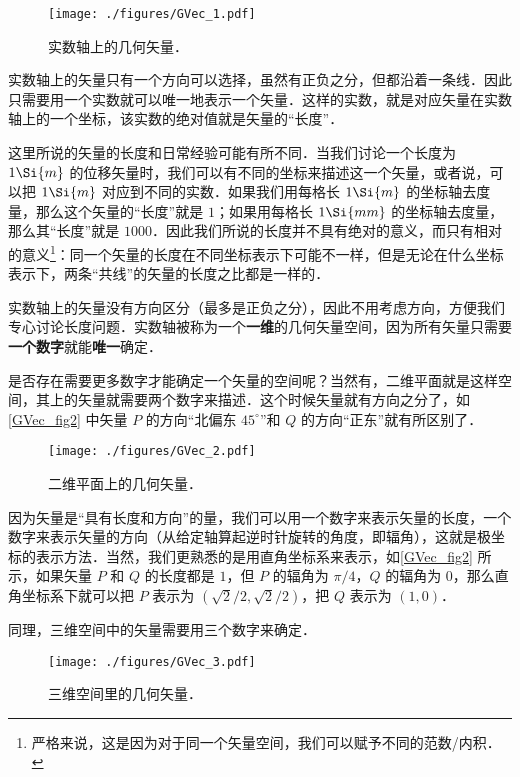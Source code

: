 \begin{figure}[ht]
\centering
\texttt{[image: ./figures/GVec\_1.pdf]}
\caption{实数轴上的几何矢量．} \label{GVec_fig1}
\end{figure}

实数轴上的矢量只有一个方向可以选择，虽然有正负之分，但都沿着一条线．因此只需要用一个实数就可以唯一地表示一个矢量．这样的实数，就是对应矢量在实数轴上的一个坐标，该实数的绝对值就是矢量的“长度”．


这里所说的矢量的长度和日常经验可能有所不同．当我们讨论一个长度为 $1\Si{m}$ 的位移矢量时，我们可以有不同的坐标来描述这一个矢量，或者说，可以把 $1\Si{m}$ 对应到不同的实数．如果我们用每格长 $1\Si{m}$ 的坐标轴去度量，那么这个矢量的“长度”就是 $1$；如果用每格长 $1\Si{mm}$ 的坐标轴去度量，那么其“长度”就是 $1000$．因此我们所说的长度并不具有绝对的意义，而只有相对的意义\footnote{严格来说，这是因为对于同一个矢量空间，我们可以赋予不同的范数/内积．}：同一个矢量的长度在不同坐标表示下可能不一样，但是无论在什么坐标表示下，两条“共线”的矢量的长度之比都是一样的．


实数轴上的矢量没有方向区分（最多是正负之分），因此不用考虑方向，方便我们专心讨论长度问题．实数轴被称为一个\textbf{一维}的几何矢量空间，因为所有矢量只需要\textbf{一个数字}就能\textbf{唯一}确定．

是否存在需要更多数字才能确定一个矢量的空间呢？当然有，二维平面就是这样空间，其上的矢量就需要两个数字来描述．这个时候矢量就有方向之分了，如\autoref{GVec_fig2} 中矢量 $P$ 的方向“北偏东 $45^\circ$”和 $Q$ 的方向“正东”就有所区别了．

\begin{figure}[ht]
\centering
\texttt{[image: ./figures/GVec\_2.pdf]}
\caption{二维平面上的几何矢量．} \label{GVec_fig2}
\end{figure}

因为矢量是“具有长度和方向”的量，我们可以用一个数字来表示矢量的长度，一个数字来表示矢量的方向（从给定轴算起逆时针旋转的角度，即辐角），这就是极坐标的表示方法．当然，我们更熟悉的是用直角坐标系来表示，如\autoref{GVec_fig2} 所示，如果矢量 $P$ 和 $Q$ 的长度都是 $1$，但 $P$ 的辐角为 $\pi/4$，$Q$ 的辐角为 $0$，那么直角坐标系下就可以把 $P$ 表示为 $(\sqrt{2}/2, \sqrt{2}/2)$，把 $Q$ 表示为 $(1, 0)$．

同理，三维空间中的矢量需要用三个数字来确定．

\begin{figure}[ht]
\centering
\texttt{[image: ./figures/GVec\_3.pdf]}
\caption{三维空间里的几何矢量．} \label{GVec_fig3}
\end{figure}

